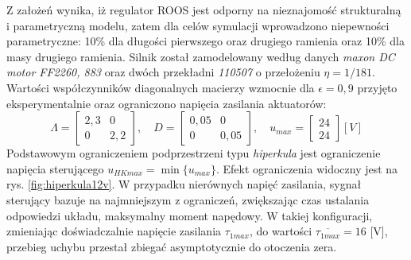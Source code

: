 \documentclass[10pt, a4paper, polish]{article}
\begin{document}
	Z założeń wynika, iż regulator ROOS jest odporny na nieznajomość strukturalną i parametryczną modelu, zatem dla celów symulacji wprowadzono niepewności parametryczne: 10\% dla długości pierwszego oraz drugiego ramienia oraz 10\% dla masy drugiego ramienia. Silnik został zamodelowany według danych \textit{maxon DC motor FF2260, 883} oraz dwóch przekładni \textit{110507} o przełożeniu $\eta=1/181$. Wartości współczynników diagonalnych macierzy wzmocnie dla $\epsilon=0,9$ przyjęto eksperymentalnie oraz ograniczono napięcia zasilania aktuatorów:
	\begin{equation}\label{eqn:regulatory}
	\Lambda=\begin{bmatrix} 2,3 & 0 \\0 & 2,2 \end{bmatrix}, \quad  
	D=\begin{bmatrix} 0,05 & 0 \\0 & 0,05 \end{bmatrix}, \quad 
	u_{max}=\begin{bmatrix}24 \\ 24 \end{bmatrix}[V]
		\end{equation}
	Podstawowym ograniczeniem podprzestrzeni typu \textit{hiperkula} jest ograniczenie napięcia sterującego $u_{HKmax}=\min\{u_{max}\}$. Efekt ograniczenia widoczny jest na rys. \ref{fig:hiperkula12v}. W przypadku nierównych napięć zasilania, sygnał sterujący bazuje na najmniejszym z ograniczeń, zwiększając czas ustalania odpowiedzi układu, maksymalny moment napędowy. W takiej konfiguracji, zmieniając doświadczalnie napięcie zasilania $\tau_{1max}$, do wartości $\overline{\tau_{1max}}= 16$ [V], przebieg uchybu przestał zbiegać asymptotycznie do otoczenia zera. 
\end{document}
